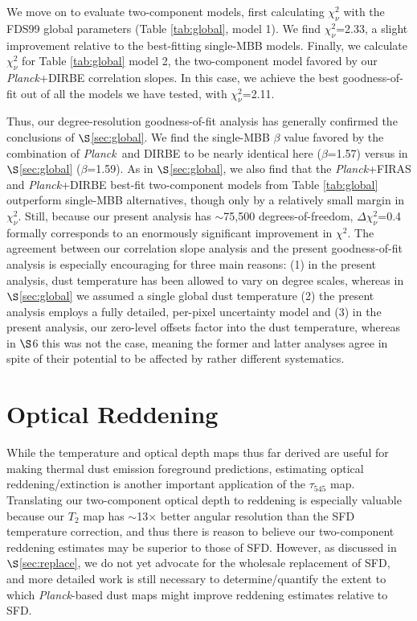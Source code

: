 \documentclass{emulateapj}
\newcommand{\PLANCK}{{\it Planck}}
\begin{document}
We move on to evaluate two-component models, first calculating $\chi^2_{\nu}$ 
with the FDS99 global parameters (Table \ref{tab:global}, model 1). We find
$\chi^2_{\nu}$=2.33, a slight improvement relative to the best-fitting
single-MBB models. Finally, we calculate $\chi^2_{\nu}$ for Table 
\ref{tab:global} model 2, the two-component model favored by our \PLANCK+DIRBE 
correlation slopes. In this case, we achieve the best goodness-of-fit out of 
all the models we have tested, with $\chi^2_{\nu}$=2.11.

Thus, our degree-resolution goodness-of-fit analysis has generally confirmed
the conclusions of $\S$\ref{sec:global}. We find the single-MBB $\beta$ value 
favored by the combination of \PLANCK~and DIRBE to be nearly identical here 
($\beta$=1.57) versus in $\S$\ref{sec:global} ($\beta$=1.59). As in 
$\S$\ref{sec:global}, we also find that the \PLANCK+FIRAS and \PLANCK+DIRBE 
best-fit two-component models from Table \ref{tab:global} outperform single-MBB
alternatives, though only by a relatively small margin in $\chi^2_{\nu}$. 
Still, because our present analysis has $\sim$75,500 degrees-of-freedom, 
$\Delta \chi^2_{\nu}$=0.4 formally corresponds to an enormously significant
improvement in $\chi^2$. The agreement between our correlation slope analysis 
and the present goodness-of-fit analysis is especially encouraging for three 
main reasons: (1) in the present analysis, dust temperature has been allowed to
vary on degree scales, whereas in $\S$\ref{sec:global} we assumed a single 
global dust temperature (2) the present analysis employs a fully detailed, 
per-pixel uncertainty model and (3) in the present analysis, our zero-level 
offsets factor into the dust temperature, whereas in $\S$6 this was not the 
case, meaning the former and latter analyses agree in spite of their potential 
to be affected by rather different systematics.

\section{Optical Reddening}
\label{sec:ebv}

While the temperature and optical depth maps thus far derived are useful for 
making thermal dust emission foreground predictions, estimating optical 
reddening/extinction is another important application of the $\tau_{545}$ map. 
Translating our two-component optical depth to reddening is especially valuable
because our $T_2$ map has $\sim$13$\times$ better angular resolution than the 
SFD temperature correction, and thus there is reason to believe our 
two-component reddening estimates may be superior to those of SFD. However, as 
discussed in $\S$\ref{sec:replace}, we do not yet advocate for the wholesale 
replacement of SFD, and more detailed work is still necessary to 
determine/quantify the extent to which \PLANCK-based dust maps might improve 
reddening estimates relative to SFD.
\end{document}
